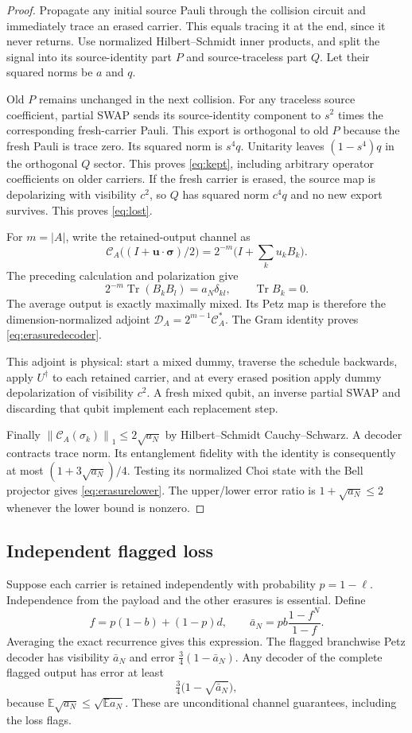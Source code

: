 \documentclass[11pt,a4paper]{article}
\newcommand{\Tr}{\operatorname{Tr}}
\newcommand{\norm}[1]{\left\lVert#1\right\rVert}
\begin{document}
\begin{proof}
Propagate any initial source Pauli through the collision circuit and immediately trace an erased carrier. This equals tracing it at the end, since it never returns. Use normalized Hilbert--Schmidt inner products, and split the signal into its source-identity part $P$ and source-traceless part $Q$. Let their squared norms be $a$ and $q$.

Old $P$ remains unchanged in the next collision. For any traceless source coefficient, partial SWAP sends its source-identity component to $s^2$ times the corresponding fresh-carrier Pauli. This export is orthogonal to old $P$ because the fresh Pauli is trace zero. Its squared norm is $s^4q$. Unitarity leaves $(1-s^4)q$ in the orthogonal $Q$ sector. This proves \eqref{eq:kept}, including arbitrary operator coefficients on older carriers. If the fresh carrier is erased, the source map is depolarizing with visibility $c^2$, so $Q$ has squared norm $c^4q$ and no new export survives. This proves \eqref{eq:lost}.

For $m=|A|$, write the retained-output channel as
\[
 \mathcal C_A\bigl((I+\boldsymbol u\cdot\boldsymbol\sigma)/2\bigr)
 =2^{-m}\bigl(I+\textstyle\sum_k u_kB_k\bigr).
\]
The preceding calculation and polarization give
\[
 2^{-m}\Tr(B_kB_l)=a_N\delta_{kl},\qquad \Tr B_k=0.
\]
The average output is exactly maximally mixed. Its Petz map is therefore the dimension-normalized adjoint $\mathcal D_A=2^{m-1}\mathcal C_A^*$. The Gram identity proves \eqref{eq:erasuredecoder}.

This adjoint is physical: start a mixed dummy, traverse the schedule backwards, apply $U^\dagger$ to each retained carrier, and at every erased position apply dummy depolarization of visibility $c^2$. A fresh mixed qubit, an inverse partial SWAP and discarding that qubit implement each replacement step.

Finally $\norm{\mathcal C_A(\sigma_k)}_1\le2\sqrt{a_N}$ by Hilbert--Schmidt Cauchy--Schwarz. A decoder contracts trace norm. Its entanglement fidelity with the identity is consequently at most $(1+3\sqrt{a_N})/4$. Testing its normalized Choi state with the Bell projector gives \eqref{eq:erasurelower}. The upper/lower error ratio is $1+\sqrt{a_N}\le2$ whenever the lower bound is nonzero.
\end{proof}

\subsection{Independent flagged loss}
Suppose each carrier is retained independently with probability $p=1-\ell$. Independence from the payload and the other erasures is essential. Define
\[
 f=p(1-b)+(1-p)d,\qquad
 \bar a_N=pb\frac{1-f^N}{1-f}.
\]
Averaging the exact recurrence gives this expression. The flagged branchwise Petz decoder has visibility $\bar a_N$ and error $\tfrac34(1-\bar a_N)$. Any decoder of the complete flagged output has error at least
\[
 \tfrac34\bigl(1-\sqrt{\bar a_N}\bigr),
\]
because $\mathbb E\sqrt{a_N}\le\sqrt{\mathbb E a_N}$. These are unconditional channel guarantees, including the loss flags.
\end{document}
